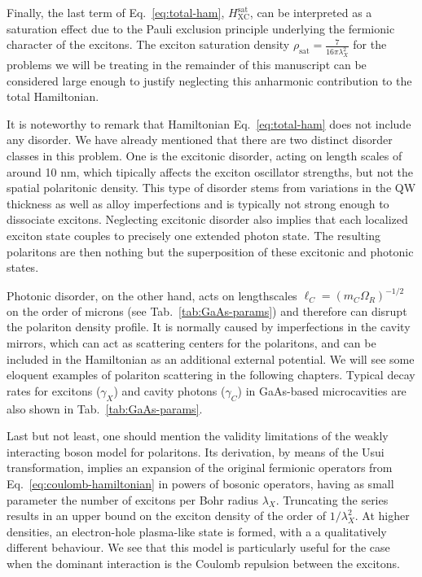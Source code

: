 Finally, the last term of Eq.~\eqref{eq:total-ham},
$H_{\text{XC}}^{\text{sat}}$, can be interpreted as a saturation
effect due to the Pauli exclusion principle underlying the fermionic
character of the excitons. The exciton saturation density
$\rho_{\text{sat}} = \frac{7}{16\pi\lambda_X^2}$ for the problems we
will be treating in the remainder of this manuscript can be considered
large enough to justify neglecting this anharmonic contribution to the
total Hamiltonian.

It is noteworthy to remark that Hamiltonian Eq.~\eqref{eq:total-ham}
does not include any disorder. We have already mentioned that there
are two distinct disorder classes in this problem. One is the
excitonic disorder, acting on length scales of around 10 nm, which
tipically affects the exciton oscillator strengths, but not the
spatial polaritonic density. This type of disorder stems from
variations in the QW thickness as well as alloy imperfections and is
typically not strong enough to dissociate excitons. Neglecting
excitonic disorder also implies that each localized exciton state
couples to precisely one extended photon state. The resulting
polaritons are then nothing but the superposition of these excitonic
and photonic states.

Photonic disorder, on the other hand, acts on lengthscales
$\ell_{C} = (m_{C}\Omega_R)^{-1/2}$ on the order of microns (see
Tab.~\ref{tab:GaAs-params}) and therefore can disrupt the polariton
density profile. It is normally caused by imperfections in the cavity
mirrors, which can act as scattering centers for the polaritons, and
can be included in the Hamiltonian as an additional external
potential. We will see some eloquent examples of polariton scattering
in the following chapters. Typical decay rates for excitons
($\gamma_X$) and cavity photons ($\gamma_C$) in GaAs-based
microcavities are also shown in Tab.~\ref{tab:GaAs-params}.

Last but not least, one should mention the validity limitations of the
weakly interacting boson model for polaritons. Its derivation, by
means of the Usui transformation, implies an expansion of the original
fermionic operators from Eq.~\eqref{eq:coulomb-hamiltonian} in powers
of bosonic operators, having as small parameter the number of excitons
per Bohr radius $\lambda_X$. Truncating the series results in an upper
bound on the exciton density of the order of $1/\lambda_X^2$. At
higher densities, an electron-hole plasma-like state is formed, with a
a qualitatively different behaviour.  We see that this model is
particularly useful for the case when the dominant interaction is the
Coulomb repulsion between the excitons.

